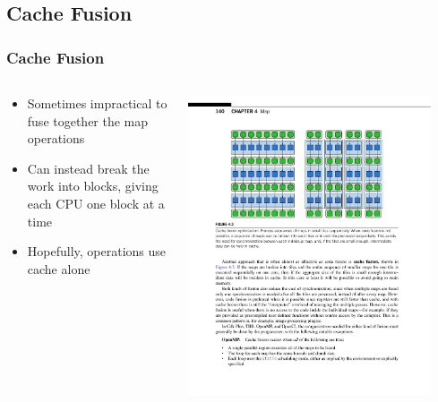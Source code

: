 \documentclass[xcolor=dvipsnames]{beamer}
\begin{document}
	\subsection{Cache Fusion}
		\begin{frame} \frametitle{Cache Fusion}
      \begin{columns}
        \begin{column}{0.48\textwidth}
          \begin{itemize}
            \item
              Sometimes impractical to fuse together the map operations
            \item
              Can instead break the work into blocks, giving each CPU one block
              at a time
            \item
              Hopefully, operations use cache alone
          \end{itemize}
        \end{column}
        \begin{column}{0.48\textwidth}
          \centering
          \includegraphics[width=0.9\textwidth]{images/figure-4-3-2}
        \end{column}
      \end{columns}
		\end{frame}
\end{document}
